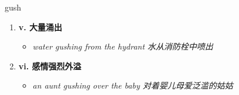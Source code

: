 
\begin{frame}
{\huge gush}
\begin{center}
\begin{enumerate}\Large
  \item \textbf{v. 大量涌出}
  \begin{itemize}
    \item \em{\Large{water gushing from the hydrant 水从消防栓中喷出}}
  \end{itemize}
  \item \textbf{vi. 感情强烈外溢}
  \begin{itemize}
    \item \em{\Large{an aunt gushing over the baby 对着婴儿母爱泛滥的姑姑}}
  \end{itemize}
\end{enumerate}
\end{center}
\end{frame}
